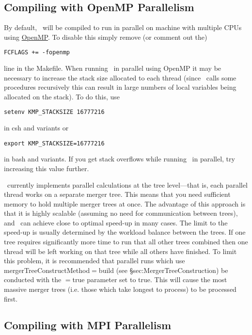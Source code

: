 \subsection{Compiling with OpenMP Parallelism}

By default, \glc\ will be compiled to run in parallel on machine with multiple CPUs using \href{http://openmp.org/wp/}{OpenMP}. To disable this simply remove (or comment out the)
\begin{verbatim}
FCFLAGS += -fopenmp
\end{verbatim}
line in the Makefile. When running \glc\ in parallel using OpenMP it may be necessary to increase the stack size allocated to each thread (since \glc\ calls some procedures recursively this can result in large numbers of local variables being allocated on the stack). To do this, use
\begin{verbatim}
setenv KMP_STACKSIZE 16777216
\end{verbatim}
in {\normalfont \ttfamily csh} and variants or
\begin{verbatim}
export KMP_STACKSIZE=16777216
\end{verbatim}
in {\normalfont \ttfamily bash} and variants. If you get stack overflows while running \glc\ in parallel, try increasing this value further.

\glc\ currently implements parallel calculations at the tree level---that is, each parallel thread works on a separate merger tree. This means that you need sufficient memory to hold multiple merger trees at once. The advantage of this approach is that it is highly scalable (assuming no need for communication between trees), and \glc\ can achieve close to optimal speed-up in many cases. The limit to the speed-up is usually determined by the workload balance between the trees. If one tree requires significantly more time to run that all other trees combined then one thread will be left working on that tree while all others have finished. To limit this problem, it is recommended that parallel runs which use {\normalfont \ttfamily mergerTreeConstructMethod}$=${\normalfont \ttfamily build} (see \S{sec:MergerTreeConstruction}) be conducted with the {\normalfont \ttfamily [mergerTreeBuildTreesProcessDescending]}$=${\normalfont \ttfamily true} parameter set to true. This will cause the most massive merger trees (i.e. those which take longest to process) to be processed first.

\subsection{Compiling with MPI Parallelism}

